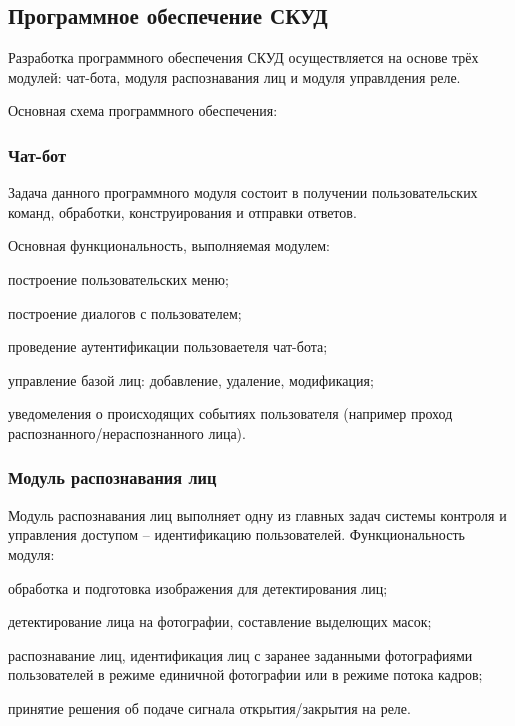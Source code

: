 \subsection{Программное обеспечение СКУД}

Разработка программного обеспечения СКУД осуществляется на основе трёх модулей: чат-бота, модуля распознавания лиц и модуля управлдения реле.

Основная схема программного обеспечения:


\subsubsection{Чат-бот}

Задача данного программного модуля состоит в получении пользовательских команд, обработки, конструирования и отправки ответов.

Основная функциональность, выполняемая модулем:

\begin{itemize*}
\item построение пользовательских меню;
\item построение диалогов с пользователем;
\item проведение аутентификации пользоваетеля чат-бота;
\item управление базой лиц: добавление, удаление, модификация;
\item уведомеления о происходящих событиях пользователя (например проход распознанного/нераспознанного лица).
\end{itemize*}

\subsubsection{Модуль распознавания лиц}

Модуль распознавания лиц выполняет одну из главных задач системы контроля и управления доступом -- идентификацию пользователей. Функциональность модуля:

\begin{itemize*}
\item обработка и подготовка изображения для детектирования лиц;
\item детектирование лица на фотографии, составление выделющих масок;
\item распознавание лиц, идентификация лиц с заранее заданными фотографиями пользователей в режиме единичной фотографии или в режиме потока кадров;
\item принятие решения об подаче сигнала открытия/закрытия на реле.
\end{itemize*}

